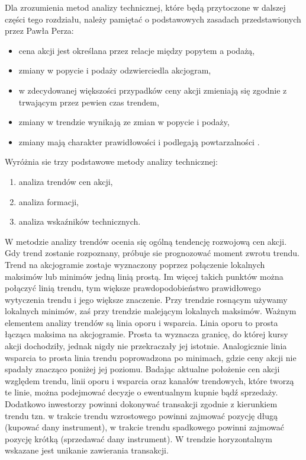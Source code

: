 \documentclass[pdflatex,11pt]{aghdpl}
\begin{document}
Dla zrozumienia metod analizy technicznej, które będą przytoczone w dalszej części tego rozdziału, należy pamiętać o podstawowych zasadach przedstawionych przez Pawła Perza:
\begin{itemize}
\item cena akcji jest określana przez relacje między popytem a podażą,
\item zmiany w popycie i podaży odzwierciedla akcjogram,
\item w zdecydowanej większości przypadków ceny akcji zmieniają się zgodnie z trwającym przez pewien czas trendem,
\item zmiany w trendzie wynikają ze zmian w popycie i podaży,
\item zmiany mają charakter prawidłowości i podlegają powtarzalności .
\end{itemize}
Wyróżnia sie trzy podstawowe metody analizy technicznej:
\begin{enumerate}
\item analiza trendów cen akcji,
\item analiza formacji,
\item analiza wskaźników technicznych.
\end{enumerate}

W metodzie analizy trendów ocenia się ogólną tendencję rozwojową cen akcji. Gdy trend zostanie rozpoznany, próbuje sie prognozować moment zwrotu trendu\cite{8}. Trend na akcjogramie zostaje wyznaczony poprzez połączenie lokalnych maksimów lub minimów jedną linią prostą. Im więcej takich punktów można połączyć linią trendu, tym większe prawdopodobieństwo prawidłowego wytyczenia trendu i jego większe znaczenie. Przy trendzie rosnącym używamy lokalnych minimów, zaś przy trendzie malejącym lokalnych maksimów. Ważnym elementem analizy trendów są linia oporu i wsparcia. Linia oporu to prosta łącząca maksima na akcjogramie. Prosta ta wyznacza granicę, do której kursy akcji dochodziły, jednak nigdy nie przekraczały jej istotnie. Analogicznie linia wsparcia to prosta linia trendu poprowadzona po minimach, gdzie ceny akcji nie spadały znacząco poniżej jej poziomu. Badając aktualne położenie cen akcji względem trendu, linii oporu i wsparcia oraz kanałów trendowych, które tworzą te linie, można podejmować decyzje o ewentualnym kupnie bądź sprzedaży. Dodatkowo inwestorzy powinni dokonywać transakcji zgodnie z kierunkiem trendu tzn. w trakcie trendu wzrostowego powinni zajmować pozycję długą (kupować dany instrument), w trakcie trendu spadkowego powinni zajmować pozycję krótką (sprzedawać dany instrument). W trendzie horyzontalnym wskazane jest unikanie zawierania transakcji\cite{6}.
\end{document}
